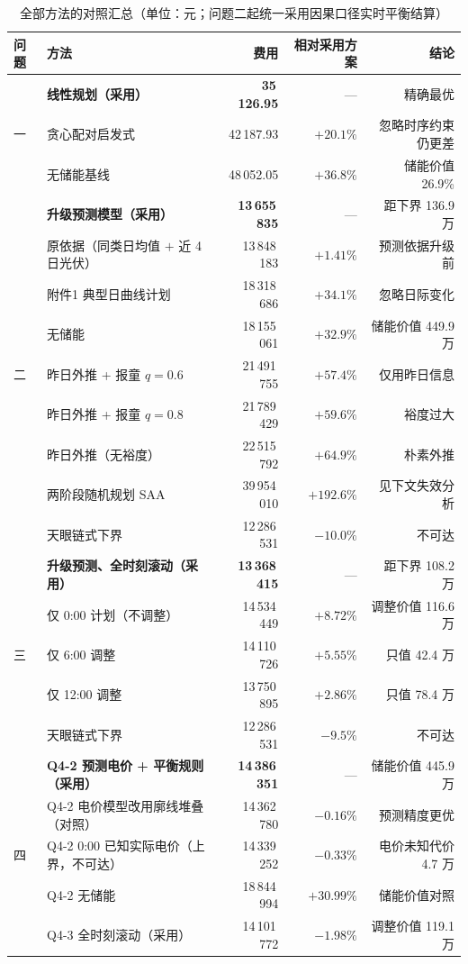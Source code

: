 \begin{table}[htbp]
\centering
\caption{全部方法的对照汇总（单位\nobreak：元\nobreak；问题二起统一采用因果口径实时平衡结算\nobreak）}
\label{tab:allcmp}
\begin{tabularx}{\textwidth}{@{}p{1.5cm}Xrrr@{}}
\toprule
问题 & 方法 & 费用 & 相对采用方案 & 结论 \\
\midrule
\multirow{3}{*}{一}
& \textbf{线性规划（采用\nobreak）} & \textbf{35\,126.95} & --- & 精确最优 \\
& 贪心配对启发式 & 42\,187.93 & $+20.1\text{\%}$ & 忽略时序约束仍更差 \\
& 无储能基线 & 48\,052.05 & $+36.8\text{\%}$ & 储能价值 26.9\% \\
\midrule
\multirow{9}{*}{二}
& \textbf{升级预测模型（采用\nobreak）} & \textbf{13\,655\,835} & --- & 距下界 136.9 万 \\
& 原依据（同类日均值 $+$ 近 4 日光伏\nobreak） & 13\,848\,183 & $+1.41\text{\%}$ & 预测依据升级前 \\
& 附件1 典型日曲线计划 & 18\,318\,686 & $+34.1\text{\%}$ & 忽略日际变化 \\
& 无储能 & 18\,155\,061 & $+32.9\text{\%}$ & 储能价值 449.9 万 \\
& 昨日外推 + 报童 $q=0.6$ & 21\,491\,755 & $+57.4\text{\%}$ & 仅用昨日信息 \\
& 昨日外推 + 报童 $q=0.8$ & 21\,789\,429 & $+59.6\text{\%}$ & 裕度过大 \\
& 昨日外推（无裕度\nobreak） & 22\,515\,792 & $+64.9\text{\%}$ & 朴素外推 \\
& 两阶段随机规划 SAA & 39\,954\,010 & $+192.6\text{\%}$ & 见下文失效分析 \\
& 天眼链式下界 & 12\,286\,531 & $-10.0\text{\%}$ & 不可达 \\
\midrule
\multirow{5}{*}{三}
& \textbf{升级预测\nobreak、全时刻滚动（采用\nobreak）} & \textbf{13\,368\,415} & --- & 距下界 108.2 万 \\
& 仅 0:00 计划（不调整\nobreak） & 14\,534\,449 & $+8.72\text{\%}$ & 调整价值 116.6 万 \\
& 仅 6:00 调整 & 14\,110\,726 & $+5.55\text{\%}$ & 只值 42.4 万 \\
& 仅 12:00 调整 & 13\,750\,895 & $+2.86\text{\%}$ & 只值 78.4 万 \\
& 天眼链式下界 & 12\,286\,531 & $-9.5\text{\%}$ & 不可达 \\
\midrule
\multirow{5}{*}{四}
& \textbf{Q4-2 预测电价 + 平衡规则（采用\nobreak）} & \textbf{14\,386\,351} & --- & 储能价值 445.9 万 \\
& Q4-2 电价模型改用廓线堆叠（对照\nobreak） & 14\,362\,780 & $-0.16\text{\%}$ & 预测精度更优 \\
& Q4-2 0:00 已知实际电价（上界\nobreak，不可达\nobreak） & 14\,339\,252 & $-0.33\text{\%}$ & 电价未知代价 4.7 万 \\
& Q4-2 无储能 & 18\,844\,994 & $+30.99\text{\%}$ & 储能价值对照 \\
& Q4-3 全时刻滚动（采用\nobreak） & 14\,101\,772 & $-1.98\text{\%}$ & 调整价值 119.1 万 \\
\bottomrule
\end{tabularx}
\end{table}

